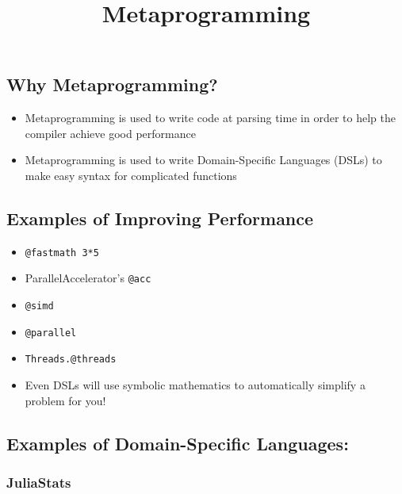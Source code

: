 \documentclass[11pt]{article}
\title{Metaprogramming}
\begin{document}
    
    
    \maketitle
    
    

    
    \subsection{Why Metaprogramming?}\label{why-metaprogramming}

\begin{itemize}
\itemsep1pt\parskip0pt
\item
  Metaprogramming is used to write code at parsing time in order to help
  the compiler achieve good performance
\item
  Metaprogramming is used to write Domain-Specific Languages (DSLs) to
  make easy syntax for complicated functions
\end{itemize}

    \subsection{Examples of Improving
Performance}\label{examples-of-improving-performance}

\begin{itemize}
\itemsep1pt\parskip0pt
\item
  \texttt{@fastmath 3*5}
\item
  ParallelAccelerator's \texttt{@acc}
\item
  \texttt{@simd}
\item
  \texttt{@parallel}
\item
  \texttt{Threads.@threads}
\item
  Even DSLs will use symbolic mathematics to automatically simplify a
  problem for you!
\end{itemize}

    \subsection{Examples of Domain-Specific
Languages:}\label{examples-of-domain-specific-languages}

\subsubsection{JuliaStats}\label{juliastats}
\end{document}

